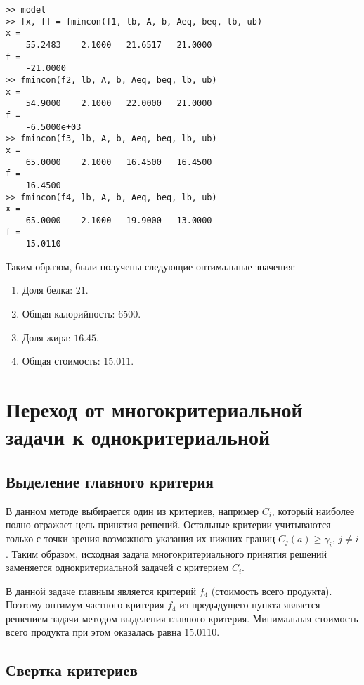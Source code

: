 

\begin{lstlisting}[caption=\code{Console}]
>> model
>> [x, f] = fmincon(f1, lb, A, b, Aeq, beq, lb, ub)
x =
	55.2483    2.1000   21.6517   21.0000
f =
	-21.0000
>> fmincon(f2, lb, A, b, Aeq, beq, lb, ub)
x =
	54.9000    2.1000   22.0000   21.0000
f =
	-6.5000e+03
>> fmincon(f3, lb, A, b, Aeq, beq, lb, ub)
x =
	65.0000    2.1000   16.4500   16.4500
f =
	16.4500
>> fmincon(f4, lb, A, b, Aeq, beq, lb, ub)
x =
	65.0000    2.1000   19.9000   13.0000
f =
	15.0110
\end{lstlisting}

Таким образом, были получены следующие оптимальные значения:

\begin{enumerate}
	\item Доля белка: $21$.
	\item Общая калорийность: $6500$.
	\item Доля жира: $16.45$.
	\item Общая стоимость: $15.011$.
\end{enumerate}

\section{Переход от многокритериальной задачи к однокритериальной}

\subsection{Выделение главного критерия}

В данном методе выбирается один из критериев, например $C_i$, который наиболее полно отражает цель принятия решений. Остальные критерии учитываются только с точки зрения возможного указания их нижних границ $C_j(a) \geq \gamma_i$, $j \neq i$. Таким образом, исходная задача многокритериального принятия решений заменяется однокритериальной задачей с критерием $C_i$.

В данной задаче главным является критерий $f_4$ (стоимость всего продукта). Поэтому оптимум частного критерия $f_4$ из предыдущего пункта является решением задачи методом выделения главного критерия. Минимальная стоимость всего продукта при этом оказалась равна $15.0110$.

\subsection{Свертка критериев}

